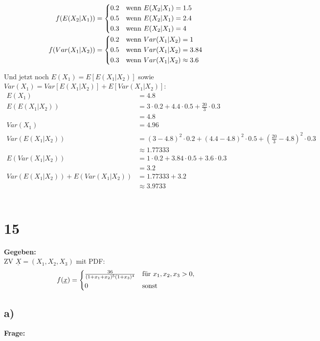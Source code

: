 \documentclass{article}
\begin{document}
\begin{align*}
    f(E(X_2|X_1)) &= \begin{cases*}
        0.2 & wenn $E(X_2|X_1) = 1.5$\\
        0.5 & wenn $E(X_2|X_1) = 2.4$ \\
        0.3 & wenn $E(X_2|X_1) = 4$
    \end{cases*}\\
    f(Var(X_1|X_2)) &= \begin{cases*}
        0.2 & wenn $Var(X_1|X_2) = 1$\\
        0.5 & wenn $Var(X_1|X_2) = 3.84$ \\
        0.3 & wenn $Var(X_1|X_2) \approx 3.6 $
    \end{cases*} \\
\end{align*}

Und jetzt noch $E(X_1) = E[E(X_1|X_2)]$ sowie $Var(X_1) = Var[E(X_1|X_2)] + E[Var(X_1|X_2)]$: 
\begin{align*}
    E(X_1) &= 4.8 \tag*{Aus b)}\\
    E(E(X_1|X_2)) &= 3 \cdot 0.2 + 4.4 \cdot 0.5 + \frac{20}{3} \cdot 0.3 \\
    &= 4.8\\
    Var(X_1) &= 4.96 \tag*{Aus b)} \\
    Var(E(X_1|X_2)) &= (3-4.8)^2 \cdot 0.2 + (4.4-4.8)^2 \cdot 0.5 + (\frac{20}{3}-4.8)^2 \cdot 0.3 \\
    &\approx 1.77333\\
    E(Var(X_1|X_2)) &= 1 \cdot 0.2 + 3.84 \cdot 0.5 + 3.6 \cdot 0.3\\
    &=3.2 \\
    Var(E(X_1|X_2)) + E(Var(X_1|X_2)) &= 1.77333 + 3.2 \\
    &\approx 3.9733 \tag*{Könnte also in Anbetracht der Rundungen hinkomen}
\end{align*} \\

\section*{15}
\textbf{Gegeben:} \\

ZV $\underline{X} = (X_1, X_2, X_3)$ mit PDF:
\[f(\underline{x}) = \begin{cases*}
    \frac{36}{(1+x_1+x_2)^5(1+x_3)^4}&für $x_1, x_2, x_3 > 0$, \\ 
    0 & sonst
\end{cases*}
\]
\subsection*{a)}
\textbf{Frage:} \\
\end{document}
